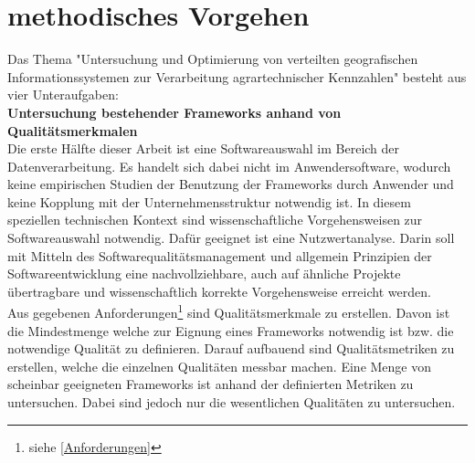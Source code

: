 \chapter{methodisches Vorgehen}



Das Thema "Untersuchung und Optimierung von verteilten geografischen Informationssystemen zur Verarbeitung agrartechnischer Kennzahlen" besteht aus vier Unteraufgaben:\\

\textbf{Untersuchung bestehender Frameworks anhand von Qualitätsmerkmalen}\\
Die erste Hälfte dieser Arbeit ist eine Softwareauswahl im Bereich der Datenverarbeitung.
Es handelt sich dabei nicht im Anwendersoftware, wodurch keine empirischen Studien der Benutzung der Frameworks durch Anwender und keine Kopplung mit der Unternehmensstruktur notwendig ist.
In diesem speziellen technischen Kontext sind wissenschaftliche Vorgehensweisen zur Softwareauswahl notwendig.
Dafür geeignet ist eine Nutzwertanalyse. %
Darin soll mit Mitteln des Softwarequalitätsmanagement und allgemein Prinzipien der Softwareentwicklung eine nachvollziehbare, auch auf ähnliche Projekte übertragbare und wissenschaftlich korrekte Vorgehensweise erreicht werden.\\
Aus gegebenen Anforderungen\footnote{siehe \ref{Anforderungen}} sind Qualitätsmerkmale zu erstellen.
Davon ist die Mindestmenge welche zur Eignung eines Frameworks notwendig ist bzw. die notwendige  Qualität zu definieren.
Darauf aufbauend sind Qualitätsmetriken zu erstellen, welche die einzelnen Qualitäten messbar machen.
Eine Menge von scheinbar geeigneten Frameworks ist anhand der definierten Metriken zu untersuchen.
Dabei sind jedoch nur die wesentlichen Qualitäten zu untersuchen.

